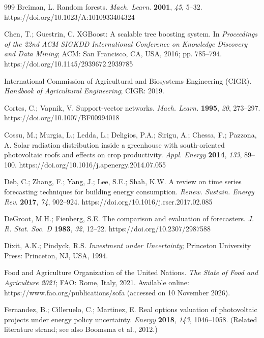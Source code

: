 \documentclass[agriengineering,article,submit,pdftex,moreauthors]{Definitions/mdpi}
\begin{document}
\begin{thebibliography}{999}
Breiman, L. Random forests. \emph{Mach. Learn.} \textbf{2001}, \emph{45}, 5--32. https://doi.org/10.1023/A:1010933404324

Chen, T.; Guestrin, C. XGBoost: A scalable tree boosting system. In \emph{Proceedings of the 22nd ACM SIGKDD International Conference on Knowledge Discovery and Data Mining}; ACM: San Francisco, CA, USA, 2016; pp. 785--794. https://doi.org/10.1145/2939672.2939785

International Commission of Agricultural and Biosystems Engineering (CIGR). \emph{Handbook of Agricultural Engineering}; CIGR: 2019.

Cortes, C.; Vapnik, V. Support-vector networks. \emph{Mach. Learn.} \textbf{1995}, \emph{20}, 273--297. https://doi.org/10.1007/BF00994018

Cossu, M.; Murgia, L.; Ledda, L.; Deligios, P.A.; Sirigu, A.; Chessa, F.; Pazzona, A. Solar radiation distribution inside a greenhouse with south-oriented photovoltaic roofs and effects on crop productivity. \emph{Appl. Energy} \textbf{2014}, \emph{133}, 89--100. https://doi.org/10.1016/j.apenergy.2014.07.055

Deb, C.; Zhang, F.; Yang, J.; Lee, S.E.; Shah, K.W. A review on time series forecasting techniques for building energy consumption. \emph{Renew. Sustain. Energy Rev.} \textbf{2017}, \emph{74}, 902--924. https://doi.org/10.1016/j.rser.2017.02.085

DeGroot, M.H.; Fienberg, S.E. The comparison and evaluation of forecasters. \emph{J. R. Stat. Soc. D} \textbf{1983}, \emph{32}, 12--22. https://doi.org/10.2307/2987588

Dixit, A.K.; Pindyck, R.S. \emph{Investment under Uncertainty}; Princeton University Press: Princeton, NJ, USA, 1994.

Food and Agriculture Organization of the United Nations. \emph{The State of Food and Agriculture 2021}; FAO: Rome, Italy, 2021. Available online: https://www.fao.org/publications/sofa (accessed on 10 November 2026).

Fernandez, B.; Cilleruelo, C.; Martinez, E. Real options valuation of photovoltaic projects under energy policy uncertainty. \emph{Energy} \textbf{2018}, \emph{143}, 1046--1058. (Related literature strand; see also Boomsma et al., 2012.)


\end{thebibliography}
\end{document}
